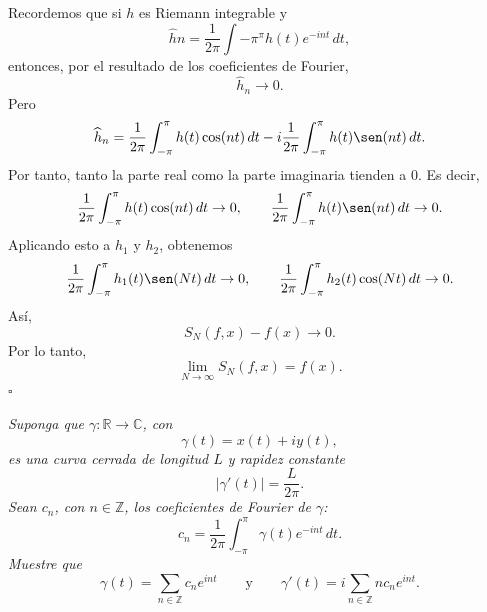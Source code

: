 \documentclass[11pt,letterpaper]{article}
\newcommand{\R}{\mathbb{R}}
\newcommand{\Z}{\mathbb{Z}}
\newcommand{\dt}{\,dt}
\begin{document}
Recordemos que si $h$ es Riemann integrable y
\begin{equation*}
    \widehat{h}n=\frac{1}{2\pi}\int{-\pi}^{\pi}h(t)e^{-int}\dt,
\end{equation*}
entonces, por el resultado de los coeficientes de Fourier,
\begin{equation*}
    \widehat{h}_n\to0.
\end{equation*}
Pero
\begin{equation*}
    \widehat{h}_n
    =\frac{1}{2\pi}\int_{-\pi}^{\pi}h(t)\cos(nt)\dt
    -i\frac{1}{2\pi}\int_{-\pi}^{\pi}h(t)\sen(nt)\dt.
\end{equation*}
Por tanto, tanto la parte real como la parte imaginaria tienden a $0$. Es decir,
\begin{equation*}
    \frac{1}{2\pi}\int_{-\pi}^{\pi}h(t)\cos(nt)\dt\to0,
    \qquad
    \frac{1}{2\pi}\int_{-\pi}^{\pi}h(t)\sen(nt)\dt\to0.
\end{equation*}
Aplicando esto a $h_1$ y $h_2$, obtenemos
\begin{equation*}
    \frac{1}{2\pi}\int_{-\pi}^{\pi}h_1(t)\sen(Nt)\dt\to0,
    \qquad
    \frac{1}{2\pi}\int_{-\pi}^{\pi}h_2(t)\cos(Nt)\dt\to0.
\end{equation*}
Así,
\begin{equation*}
    S_N(f,x)-f(x)\to0.
\end{equation*}
Por lo tanto,
\begin{equation*}
    \lim_{N\to\infty}S_N(f,x)=f(x).
\end{equation*}
\hfill $\square$

\newpage

\begin{tcolorbox}[title=\textcolor{white}{Problema 12}]
\textit{Suponga que $\gamma:\R\to\mathbb C$, con}
\begin{equation*}
    \gamma(t)=x(t)+iy(t),
\end{equation*}
\textit{es una curva cerrada de longitud $L$ y rapidez constante}
\begin{equation*}
    |\gamma'(t)|=\frac{L}{2\pi}.
\end{equation*}
\textit{Sean $c_n$, con $n\in\Z$, los coeficientes de Fourier de $\gamma$:}
\begin{equation*}
    c_n=\frac{1}{2\pi}\int_{-\pi}^{\pi}\gamma(t)e^{-int}\,dt.
\end{equation*}
\textit{Muestre que}
\begin{equation*}
    \gamma(t)=\sum_{n\in\Z}c_ne^{int}
    \qquad\text{y}\qquad
    \gamma'(t)=i\sum_{n\in\Z}nc_ne^{int}.
\end{equation*}
\end{tcolorbox}
\end{document}

